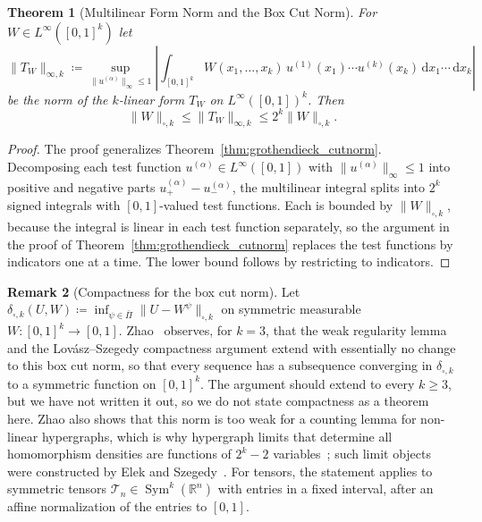 \documentclass[11pt,a4paper,reqno]{amsart}
\newtheorem{theorem}{Theorem}[section]
\theoremstyle{definition}
\newtheorem{remark}[theorem]{Remark}
\numberwithin{equation}{section}
\newcommand{\R}{\mathbb{R}}
\newcommand{\dif}{\,\mathrm{d}}
\begin{document}
\begin{theorem}[Multilinear Form Norm and the Box Cut Norm]
\label{thm:hypergraphon_compactness}
For $W \in L^\infty([0,1]^k)$ let
\begin{equation}
    \|T_W\|_{\infty, k} \coloneqq \sup_{\|u^{(\alpha)}\|_\infty \le 1} \left| \int_{[0,1]^k} W(x_1, \dots, x_k)\, u^{(1)}(x_1) \cdots u^{(k)}(x_k) \dif x_1 \cdots \dif x_k \right|
\end{equation}
be the norm of the $k$-linear form $T_W$ on $L^\infty([0,1])^k$. Then
\begin{equation}
    \|W\|_{\square, k} \le \|T_W\|_{\infty, k} \le 2^k \|W\|_{\square, k}.
\end{equation}
\end{theorem}
\begin{proof}
The proof generalizes Theorem~\ref{thm:grothendieck_cutnorm}. Decomposing each test function $u^{(\alpha)} \in L^\infty([0, 1])$ with $\|u^{(\alpha)}\|_\infty \le 1$ into positive and negative parts $u_+^{(\alpha)} - u_-^{(\alpha)}$, the multilinear integral splits into $2^k$ signed integrals with $[0,1]$-valued test functions. Each is bounded by $\|W\|_{\square, k}$, because the integral is linear in each test function separately, so the argument in the proof of Theorem~\ref{thm:grothendieck_cutnorm} replaces the test functions by indicators one at a time. The lower bound follows by restricting to indicators.
\end{proof}

\begin{remark}[Compactness for the box cut norm]
\label{rem:hypergraphon_compactness}
Let $\delta_{\square, k}(U, W) \coloneqq \inf_{\psi \in \bar{\Pi}} \|U - W^\psi\|_{\square, k}$ on symmetric measurable $W \colon [0,1]^k \to [0,1]$. Zhao~\cite[\S3]{zhao2015hypergraph} observes, for $k = 3$, that the weak regularity lemma and the Lov\'asz--Szegedy compactness argument extend with essentially no change to this box cut norm, so that every sequence has a subsequence converging in $\delta_{\square,k}$ to a symmetric function on $[0,1]^k$. The argument should extend to every $k \ge 3$, but we have not written it out, so we do not state compactness as a theorem here. Zhao also shows that this norm is too weak for a counting lemma for non-linear hypergraphs, which is why hypergraph limits that determine all homomorphism densities are functions of $2^k - 2$ variables~\cite{zhao2015hypergraph}; such limit objects were constructed by Elek and Szegedy~\cite{elek2012measure}. For tensors, the statement applies to symmetric tensors $\mathcal{T}_n \in \operatorname{Sym}^k(\R^n)$ with entries in a fixed interval, after an affine normalization of the entries to $[0,1]$.
\end{remark}
\end{document}
